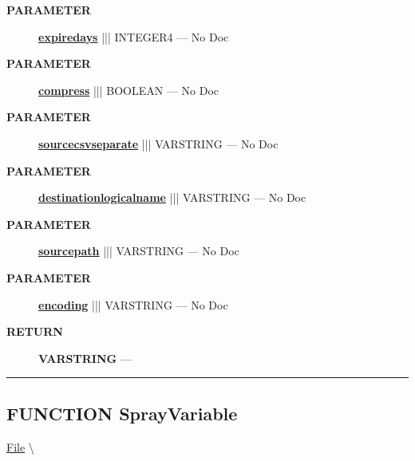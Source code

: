 \begin{description}
\item [\colorbox{tagtype}{\color{white} \textbf{\textsf{PARAMETER}}}] \textbf{\underline{expiredays}} ||| INTEGER4 --- No Doc
\item [\colorbox{tagtype}{\color{white} \textbf{\textsf{PARAMETER}}}] \textbf{\underline{compress}} ||| BOOLEAN --- No Doc
\item [\colorbox{tagtype}{\color{white} \textbf{\textsf{PARAMETER}}}] \textbf{\underline{sourcecsvseparate}} ||| VARSTRING --- No Doc
\item [\colorbox{tagtype}{\color{white} \textbf{\textsf{PARAMETER}}}] \textbf{\underline{destinationlogicalname}} ||| VARSTRING --- No Doc
\item [\colorbox{tagtype}{\color{white} \textbf{\textsf{PARAMETER}}}] \textbf{\underline{sourcepath}} ||| VARSTRING --- No Doc
\item [\colorbox{tagtype}{\color{white} \textbf{\textsf{PARAMETER}}}] \textbf{\underline{encoding}} ||| VARSTRING --- No Doc
\end{description}







\par
\begin{description}
\item [\colorbox{tagtype}{\color{white} \textbf{\textsf{RETURN}}}] \textbf{VARSTRING} --- 
\end{description}




\rule{\linewidth}{0.5pt}
\subsection*{\textsf{\colorbox{headtoc}{\color{white} FUNCTION}
SprayVariable}}

\hypertarget{ecldoc:file.sprayvariable}{}
\hspace{0pt} \hyperlink{ecldoc:File}{File} \textbackslash 

